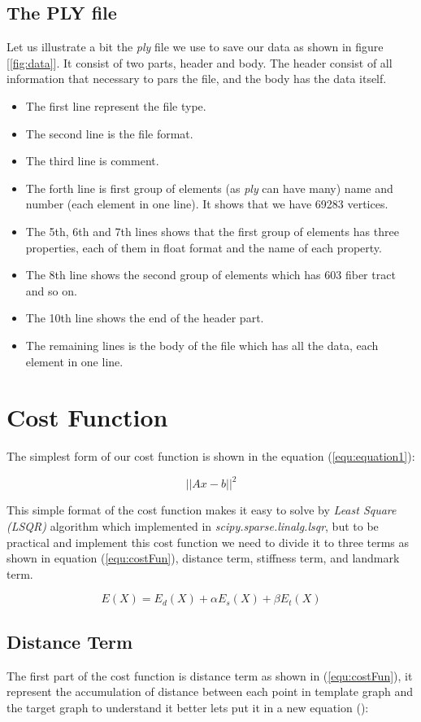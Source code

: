 \documentclass[../structure.tex]{subfiles}
\begin{document}
\subsection{The PLY file}
Let us illustrate a bit the \textit{ply} file we use to save our data as shown in figure [\ref{fig:data}]. It consist of two parts, header and body. The header consist of all information that necessary to pars the file, and the body has the data itself.
\begin{itemize}
\item The first line represent the file type.
\item The second line is the file format.
\item The third line is comment.
\item The forth line is first group of elements (as \textit{ply} can have many) name and number (each element in one line). It shows that we have 69283 vertices.
\item The 5th, 6th and 7th lines shows that the first group of elements has three properties, each of them in float format and the name of each property.
\item The 8th line shows the second group of elements which has 603 fiber tract and so on.
\item The 10th line shows the end of the header part.
\item The remaining lines is the body of the file which has all the data, each element in one line.
\end{itemize}

\section{Cost Function}
The simplest form of our cost function is shown in the equation (\ref{equ:equation1}):

\begin{equation}
\label{equ:equation1}
||Ax-b||^2
\end{equation}

This simple format of the cost function makes it easy to solve by \textit{Least Square (LSQR)} algorithm which implemented in \textit{scipy.sparse.linalg.lsqr}, but to be practical and implement this cost function we need to divide it to three terms as shown in equation (\ref{equ:costFun}), distance term, stiffness term, and landmark term.

\begin{equation}
E(X) = E_{d}(X) + \alpha E_{s}(X) + \beta E_{t}(X)
\label{equ:costFun}
\end{equation}

\subsection{Distance Term}
The first part of the cost function is distance term as shown in (\ref{equ:costFun}), it represent the accumulation of distance between each point in template graph and the target graph 
 to understand it better lets put it in a new equation ():
\end{document}
